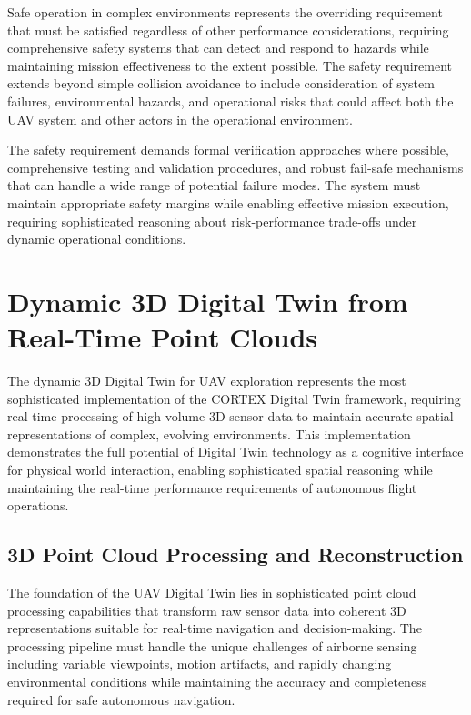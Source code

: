 Safe operation in complex environments represents the overriding requirement that must be satisfied regardless of other performance considerations, requiring comprehensive safety systems that can detect and respond to hazards while maintaining mission effectiveness to the extent possible. The safety requirement extends beyond simple collision avoidance to include consideration of system failures, environmental hazards, and operational risks that could affect both the UAV system and other actors in the operational environment.

The safety requirement demands formal verification approaches where possible, comprehensive testing and validation procedures, and robust fail-safe mechanisms that can handle a wide range of potential failure modes. The system must maintain appropriate safety margins while enabling effective mission execution, requiring sophisticated reasoning about risk-performance trade-offs under dynamic operational conditions.

\section{Dynamic 3D Digital Twin from Real-Time Point Clouds}

The dynamic 3D Digital Twin for UAV exploration represents the most sophisticated implementation of the CORTEX Digital Twin framework, requiring real-time processing of high-volume 3D sensor data to maintain accurate spatial representations of complex, evolving environments. This implementation demonstrates the full potential of Digital Twin technology as a cognitive interface for physical world interaction, enabling sophisticated spatial reasoning while maintaining the real-time performance requirements of autonomous flight operations.

\subsection{3D Point Cloud Processing and Reconstruction}

The foundation of the UAV Digital Twin lies in sophisticated point cloud processing capabilities that transform raw sensor data into coherent 3D representations suitable for real-time navigation and decision-making. The processing pipeline must handle the unique challenges of airborne sensing including variable viewpoints, motion artifacts, and rapidly changing environmental conditions while maintaining the accuracy and completeness required for safe autonomous navigation.

